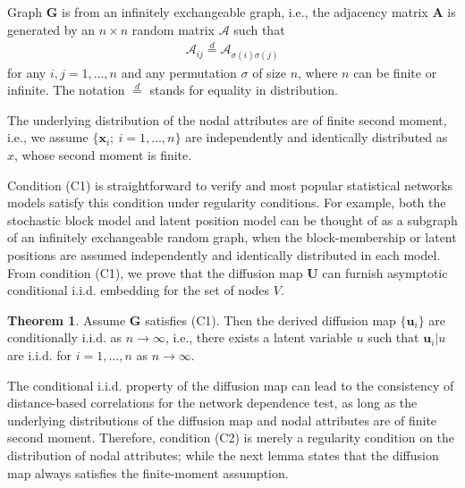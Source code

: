 \documentclass[12pt]{article}
\theoremstyle{definition}
\newtheorem{theorem}{Theorem}
\begin{document}
	\begin{description}[align=left]
		\item [(C1)] Graph $\mathbf{G}$ is from an infinitely exchangeable graph, i.e., the adjacency matrix $\mathbf{A}$ is generated by an $n \times n$ random matrix $\mathcal{A}$ such that 
		\begin{align*}
		\mathcal{A}_{ij} \stackrel{d}{=} \mathcal{A}_{\sigma(i) \sigma(j)}
		\end{align*}
		for any $i,j=1,\ldots,n$ and any permutation $\sigma$ of size $n$, where $n$ can be finite or infinite. The notation $\stackrel{d}{=}$ stands for equality in distribution. 
		
		\item [(C2)] The underlying distribution of the nodal attributes are of finite second moment, i.e., we assume $\{\mathbf{x}_{i};~i=1,\ldots,n\}$ are independently and identically distributed as $x$, whose second moment is finite.
	\end{description}
	
	Condition (C1) is straightforward to verify and most popular statistical networks models satisfy this condition under regularity conditions. For example, both the stochastic block model and latent position model can be thought of as a subgraph of an infinitely exchangeable random graph, when the block-membership or latent positions are assumed independently and identically distributed in each model. From condition (C1), we prove that the diffusion map $\mathbf{U}$ can furnish asymptotic conditional i.i.d. embedding for the set of nodes $V$. 
	
	\begin{theorem}
		\label{main_lemma}
		Assume $\mathbf{G}$ satisfies (C1). Then the derived diffusion map $\{ \mathbf{u}_{i}\}$ are conditionally i.i.d. as $n \rightarrow \infty$,  i.e., there exists a latent variable $u$ such that $\mathbf{u}_{i}|u$ are i.i.d. for $i=1,\ldots,n$ as $n \rightarrow \infty$.  
	\end{theorem} 
	
	The conditional i.i.d. property of the diffusion map can lead to the consistency of distance-based correlations for the network dependence test, as long as the underlying distributions of the diffusion map and nodal attributes are of finite second moment. Therefore, condition (C2) is merely a regularity condition on the distribution of nodal attributes; while the next lemma states that the diffusion map always satisfies the finite-moment assumption.
	
\end{document}
